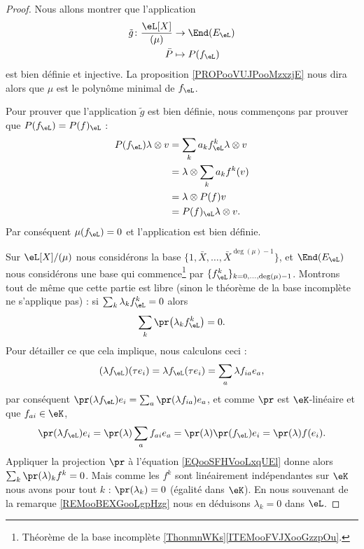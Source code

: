 \begin{proof}
    Nous allons montrer que l'application
    \begin{equation}
        \begin{aligned}
            \tilde g\colon \frac{ \eL[X] }{ (\mu) }&\to \End(E_{\eL}) \\
            \bar P&\mapsto P(f_{\eL}) 
        \end{aligned}
    \end{equation}
    est bien définie et injective. La proposition \ref{PROPooVUJPooMzxzjE} nous dira alors que \( \mu\) est le polynôme minimal de \( f_{\eL}\).

    Pour prouver que l'application \( \tilde g\) est bien définie, nous commençons par prouver que  \( P(f_{\eL})=P(f)_{\eL}\) :
    \begin{subequations}
        \begin{align}
            P(f_{\eL})\lambda\otimes v&=\sum_ka_kf_{\eL}^k\lambda\otimes v\\
            &=\lambda\otimes \sum_ka_kf^k(v)\\
            &=\lambda\otimes P(f)v\\
            &=P(f)_{\eL}\lambda\otimes v.
        \end{align}
    \end{subequations}
    Par conséquent \( \mu(f_{\eL})=0\) et l'application est bien définie.

    Sur \( \eL[X]/(\mu)\) nous considérons la base \( \{ 1,\bar X,\ldots, \bar X^{\deg(\mu)-1} \}\), et \( \End(E_{\eL})\) nous considérons une base qui commence\footnote{Théorème de la base incomplète \ref{ThonmnWKs}\ref{ITEMooFVJXooGzzpOu}.} par \( \{ f_{\eL}^k \}_{k=0,\ldots, \deg(\mu)-1}\). Montrons tout de même que cette partie est libre (sinon le théorème de la base incomplète ne s'applique pas) : si \( \sum_k\lambda_kf_{\eL}^k=0\) alors
    \begin{equation}        \label{EQooSFHVooLxqUEl}
        \sum_k\pr\big( \lambda_k f_{\eL}^k\big)=0.
    \end{equation}
    Pour détailler ce que cela implique, nous calculons ceci :
    \begin{equation}
        (\lambda f_{\eL})(\tau e_i)=\lambda f_{\eL}(\tau e_i)=\sum_a \lambda f_{ia}e_a,
    \end{equation}
    par conséquent \( \pr(\lambda f_{\eL})e_i=\sum_a\pr(\lambda f_{ia})e_a\), et comme \( \pr\) est \( \eK\)-linéaire et que \( f_{ai}\in \eK\),
    \begin{equation}
        \pr(\lambda f_{\eL})e_i=\pr(\lambda)\sum_a f_{ai}e_a=\pr(\lambda)\pr(f_\eL)e_i=\pr(\lambda)f(e_i).
    \end{equation}
    Appliquer la projection \( \pr\) à l'équation \eqref{EQooSFHVooLxqUEl} donne alors \( \sum_k\pr(\lambda)_kf^k=0\). Mais comme les \( f^k\) sont linéairement indépendantes sur \( \eK\) nous avons pour tout \( k\) : \( \pr(\lambda_k)=0\) (égalité dans \( \eK\)). En nous souvenant de la remarque \ref{REMooBEXGooLgpHzg} nous en déduisons \( \lambda_k=0\) dans \( \eL\).


\end{proof}
